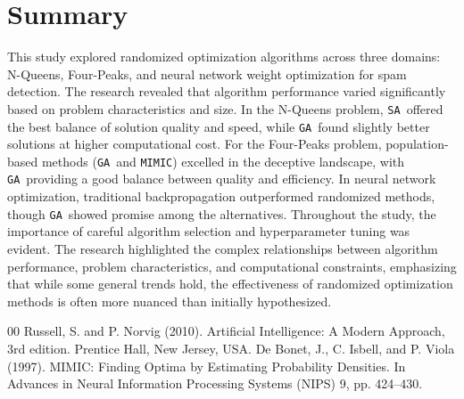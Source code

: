 \documentclass[conference]{IEEEtran}
\newcommand{\sa}{\texttt{SA}}
\newcommand{\ga}{\texttt{GA}}
\newcommand{\mimic}{\texttt{MIMIC}}
\begin{document}
\section{Summary}
This study explored randomized optimization algorithms across three domains: N-Queens, Four-Peaks, and neural network weight optimization for spam detection. The research revealed that algorithm performance varied significantly based on problem characteristics and size. In the N-Queens problem, \sa\ offered the best balance of solution quality and speed, while \ga\ found slightly better solutions at higher computational cost. For the Four-Peaks problem, population-based methods (\ga\ and \mimic) excelled in the deceptive landscape, with \ga\ providing a good balance between quality and efficiency. In neural network optimization, traditional backpropagation outperformed randomized methods, though \ga\ showed promise among the alternatives. Throughout the study, the importance of careful algorithm selection and hyperparameter tuning was evident. The research highlighted the complex relationships between algorithm performance, problem characteristics, and computational constraints, emphasizing that while some general trends hold, the effectiveness of randomized optimization methods is often more nuanced than initially hypothesized.

\begin{thebibliography}{00}
 Russell, S. and P. Norvig (2010). Artificial Intelligence: A Modern Approach, 3rd edition. Prentice Hall, New Jersey, USA.
 De Bonet, J., C. Isbell, and P. Viola (1997). MIMIC: Finding Optima by Estimating Probability Densities. In Advances in Neural Information Processing Systems (NIPS) 9, pp. 424–430.
\end{thebibliography}
\end{document}

